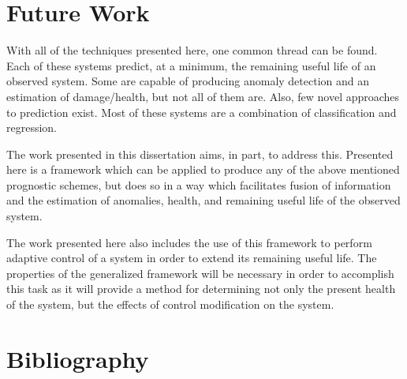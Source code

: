 \documentclass[12pt]{article}
\begin{document}
\section{Future Work}
With all of the techniques presented here, one common thread can be found.
Each of these systems predict, at a minimum, the remaining useful life of an
observed system.  Some are capable of producing anomaly detection and an
estimation of damage/health, but not all of them are.  Also, few novel
approaches to prediction exist.  Most of these systems are a combination of
classification and regression.

The work presented in this dissertation aims, in part, to address this.
Presented here is a framework which can be applied to produce any of the above
mentioned prognostic schemes, but does so in a way which facilitates fusion of
information and the estimation of anomalies, health, and remaining useful life
of the observed system.  

The work presented here also includes the use of this framework to perform
adaptive control of a system in order to extend its remaining useful life.  The
properties of the generalized framework will be necessary in order to
accomplish this task as it will provide a method for determining not only the
present health of the system, but the effects of control modification on the
system.  


\section{Bibliography}


\end{document}
